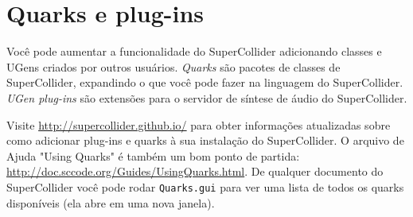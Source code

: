 \section{Quarks e plug-ins}

Você pode aumentar a funcionalidade do SuperCollider adicionando classes e UGens criados por outros usuários. \emph{Quarks} são pacotes de classes de SuperCollider, expandindo o que você pode fazer na linguagem do SuperCollider. \emph{UGen plug-ins} são extensões para o servidor de síntese de áudio do SuperCollider.

Visite \url{http://supercollider.github.io/} para obter informações atualizadas sobre como adicionar plug-ins e quarks à sua instalação do SuperCollider. O arquivo de Ajuda "Using Quarks" é também um bom ponto de partida: \url{http://doc.sccode.org/Guides/UsingQuarks.html}. De qualquer documento do SuperCollider você pode rodar \texttt{Quarks.gui} para ver uma lista de todos os quarks disponíveis (ela abre em uma nova janela).
